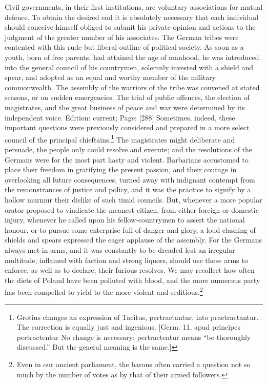 Civil governments, in their first institutions, are voluntary associations for mutual defence. To obtain the desired end it is absolutely necessary that each individual should conceive himself obliged to submit his private opinion and actions to the judgment of the greater number of his associates. The German tribes were contented with this rude but liberal outline of political society. As soon as a youth, born of free parents, had attained the age of manhood, he was introduced into the general council of his countrymen, solemnly invested with a shield and spear, and adopted as an equal and worthy member of the military commonwealth. The assembly of the warriors of the tribe was convened at stated seasons, or on sudden emergencies. The trial of public offences, the election of magistrates, and the great business of peace and war were determined by its independent voice. Edition: current; Page: [288] Sometimes, indeed, these important questions were previously considered and prepared in a more select council of the principal chieftains.\footnote{Grotius changes an expression of Tacitus, pertractantur, into praetractantur. The correction is equally just and ingenious. [Germ. 11, apud principes pertractentur No change is necessary; pertractentur means \texthebrew{“}be thoroughly discussed.\texthebrew{}” But the general meaning is the same.]} The magistrates might deliberate and persuade, the people only could resolve and execute; and the resolutions of the Germans were for the most part hasty and violent. Barbarians accustomed to place their freedom in gratifying the present passion, and their courage in overlooking all future consequences, turned away with indignant contempt from the remonstrances of justice and policy, and it was the practice to signify by a hollow murmur their dislike of such timid councils. But, whenever a more popular orator proposed to vindicate the meanest citizen, from either foreign or domestic injury, whenever he called upon his fellow-countrymen to assert the national honour, or to pursue some enterprise full of danger and glory, a loud clashing of shields and spears expressed the eager applause of the assembly. For the Germans always met in arms, and it was constantly to be dreaded lest an irregular multitude, inflamed with faction and strong liquors, should use those arms to enforce, as well as to declare, their furious resolves. We may recollect how often the diets of Poland have been polluted with blood, and the more numerous party has been compelled to yield to the more violent and seditious.\footnote{Even in our ancient parliament, the barons often carried a question not so much by the number of votes as by that of their armed followers.}

